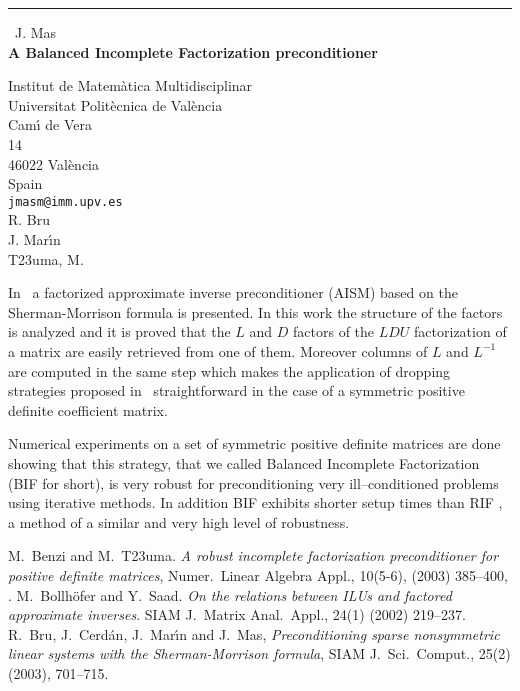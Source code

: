 \documentclass{report}
\begin{document}
\begin{center}
\rule{6in}{1pt} \
{\large J. Mas \\
{\bf A Balanced Incomplete Factorization preconditioner}}

Institut de Matem\`atica Multidisciplinar \\ Universitat Polit\`ecnica de Val\`encia \\ Cam\'{\i} de Vera \\ 14 \\ 46022 Val\`encia \\ Spain
\\
{\tt jmasm@imm.upv.es}\\
R. Bru\\
J. Mar\'{\i}n\\
	T\accent23uma, M.\end{center}

In~\cite{bcmm:03} a factorized approximate inverse preconditioner
(AISM) based on the Sherman-Morrison formula is presented. In this work
the structure of the factors is analyzed and it is proved that the $L$ and
$D$ factors of the $LDU$ factorization of a matrix are easily retrieved from
one of them.
Moreover columns of $L$ and $L^{-1}$ are computed in the same step which makes
the application of dropping strategies proposed in~\cite{bs:02} straightforward
in the case of a symmetric positive definite coefficient matrix.

Numerical experiments on a set of symmetric positive definite matrices are done
showing that this strategy, that we called Balanced Incomplete Factorization
(BIF for short), is very robust for preconditioning very ill--conditioned
problems using iterative methods.
In addition BIF exhibits shorter setup times than RIF \cite{betu:03},
a method
of a similar and very high level of robustness.


\begin{thebibliography}{99}
M.\ Benzi and M.\ T\accent23uma.
{\em A robust incomplete factorization preconditioner for positive definite
matrices}, Numer.\ Linear Algebra Appl., 10(5-6), (2003) 385--400, .
\bibitem{bs:02}
M.\ Bollh\"ofer and Y.\ Saad.
{\em On the relations between ILUs and factored approximate inverses}.
SIAM J.\ Matrix Anal.\ Appl., 24(1) (2002) 219--237.
R.\ Bru, J.\ Cerd\'an, J.\ Mar\'{\i}n and J.\ Mas, {\em Preconditioning
sparse nonsymmetric linear systems
with the Sherman-Morrison formula}, SIAM J.\ Sci.\ Comput., 25(2) (2003),
701--715.

\end{thebibliography}
\end{document}
